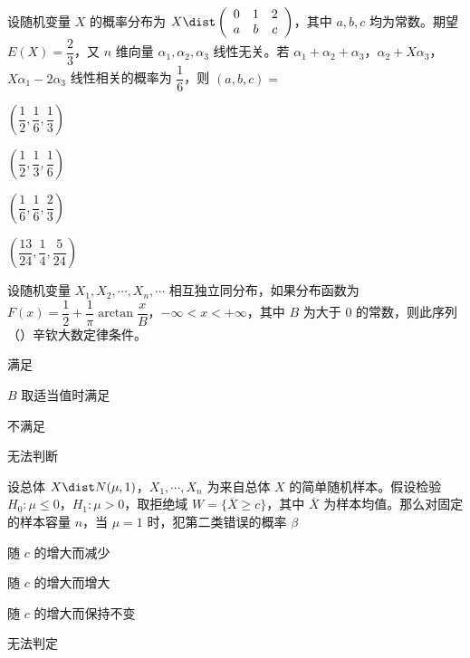 \begin{question}[index=8]
设随机变量 $X$ 的概率分布为 $X\dist\left(\begin{array}{ccc}0&1&2\\a&b&c\end{array}\right)$，其中 $a,b,c$ 均为常数。期望 $E(X)=\dfrac23$，又 $n$ 维向量 $\alpha_1,\alpha_2,\alpha_3$ 线性无关。若 $\alpha_1+\alpha_2+\alpha_3$，$\alpha_2+X\alpha_3$，$X\alpha_1-2\alpha_3$ 线性相关的概率为 $\dfrac16$，则 $(a,b,c)=$
\begin{choices}[columns=4]
\item $\left(\dfrac12,\dfrac16,\dfrac13\right)$
\item $\left(\dfrac12,\dfrac13,\dfrac16\right)$
\item $\left(\dfrac16,\dfrac16,\dfrac23\right)$
\item $\left(\dfrac{13}{24},\dfrac14,\dfrac5{24}\right)$
\end{choices}
\end{question}
\QuestionBreak

\begin{question}[index=9]
设随机变量 $X_1,X_2,\cdots,X_n,\cdots$ 相互独立同分布，如果分布函数为 $F(x)=\dfrac12+\dfrac1\pi\arctan\dfrac{x}{B}$，$-\infty<x<+\infty$，其中 $B$ 为大于 $0$ 的常数，则此序列\quad（\quad）辛钦大数定律条件。
\begin{choices}[columns=2]
\item 满足
\item $B$ 取适当值时满足
\item 不满足
\item 无法判断
\end{choices}
\end{question}
\QuestionBreak

\begin{question}[index=10]
设总体 $X\dist N(\mu,1)$，$X_1,\cdots,X_n$ 为来自总体 $X$ 的简单随机样本。假设检验 \allowbreak\mbox{$H_0\colon \mu\le0$}，\allowbreak\mbox{$H_1\colon\mu>0$}，取拒绝域 $W=\{\overline X\ge c\}$，其中 $\overline X$ 为样本均值。那么对固定的样本容量 $n$，当 $\mu=1$ 时，\allowbreak\mbox{犯第二类错误}的概率 $\beta$
\begin{choices}[columns=2]
\item 随 $c$ 的增大而减少
\item 随 $c$ 的增大而增大
\item 随 $c$ 的增大而保持不变
\item 无法判定
\end{choices}
\end{question}
